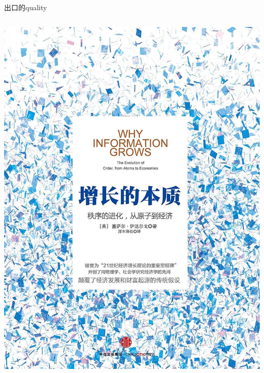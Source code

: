 \documentclass[10pt,hyperref={CJKbookmarks=true},xcolor=dvipsnames,aspectratio=169]{beamer}
\begin{document}
\begin{frame}{出口的quality}
\begin{columns}[onlytextwidth]
	  \begin{column}{0.4\textwidth}
	  \includegraphics[scale=0.1]{fig/gravity/hidalgo}
	  \end{column}
  \end{columns}
\end{frame}
\end{document}
